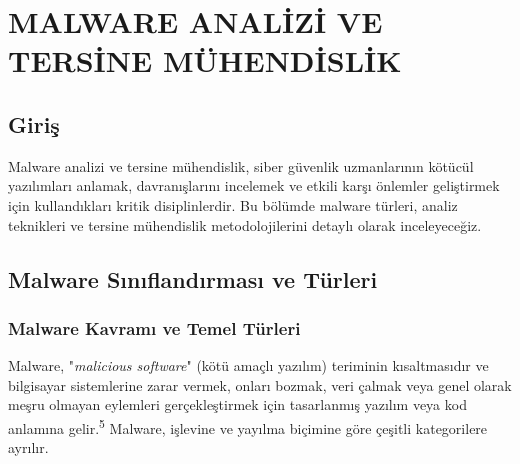 ﻿\chapter{MALWARE ANALİZİ VE TERSİNE MÜHENDİSLİK}

\section*{Giriş}
Malware analizi ve tersine mühendislik, siber güvenlik uzmanlarının kötücül yazılımları anlamak, davranışlarını incelemek ve etkili karşı önlemler geliştirmek için kullandıkları kritik disiplinlerdir. Bu bölümde malware türleri, analiz teknikleri ve tersine mühendislik metodolojilerini detaylı olarak inceleyeceğiz.

\section{Malware Sınıflandırması ve Türleri}

\subsection{Malware Kavramı ve Temel Türleri}

Malware, "\textit{malicious software}" (kötü amaçlı yazılım) teriminin kısaltmasıdır ve bilgisayar sistemlerine zarar vermek, onları bozmak, veri çalmak veya genel olarak meşru olmayan eylemleri gerçekleştirmek için tasarlanmış yazılım veya kod anlamına gelir.\textsuperscript{5} Malware, işlevine ve yayılma biçimine göre çeşitli kategorilere ayrılır.


